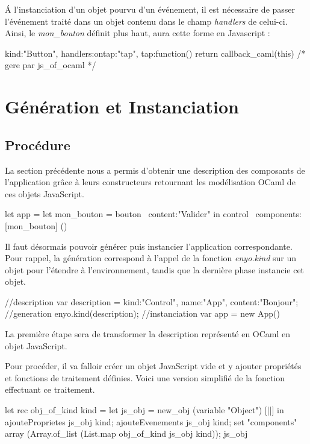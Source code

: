 \documentclass[11pt,a4paper]{report}
\begin{document}
\'A l'instanciation d'un objet pourvu d'un événement, il est nécessaire de passer l'événement traité
dans un objet contenu dans le champ \emph{handlers} de celui-ci. Ainsi, le \emph{mon\_bouton} définit plus haut,
aura cette forme en Javascript :

\begin{JavaScript}
  {kind:"Button", handlers:{ontap:"tap"}, 
    tap:function(){ return callback_caml(this) /* gere par js_of_ocaml */ }}
\end{JavaScript}

\section{Génération et Instanciation}
\subsection{Procédure}

La section précédente nous a permis d'obtenir une description des composants de l'application
grâce à leurs constructeurs retournant les modélisation OCaml de ces objets JavaScript.

\begin{OCaml}
let app = let mon_bouton = bouton ~content:"Valider" in
    control ~components:[mon_bouton] ()
\end{OCaml}

Il faut désormais pouvoir générer puis instancier l'application correspondante. Pour rappel, la génération
correspond à l'appel de la fonction \emph{enyo.kind} sur un objet pour l'étendre à l'environnement,
tandis que la dernière phase instancie cet objet.

\begin{JavaScript}
  //description
  var description = {kind:"Control", name:"App", content:"Bonjour"};
  //generation
  enyo.kind(description);
  //instanciation
  var app = new App()
\end{JavaScript}

La première étape sera de transformer la description représenté en OCaml en objet JavaScript.

Pour procéder, il va falloir créer un objet JavaScript vide et y ajouter propriétés et fonctions
de traitement définies. Voici une version simplifié de la fonction effectuant ce traitement.

\begin{OCaml}
  let rec obj_of_kind kind = 
      let js_obj = new_obj (variable "Object") [||] in
          ajouteProprietes js_obj kind;
          ajouteEvenements js_obj kind;
          set "components" array (Array.of_list (List.map obj_of_kind js_obj kind));
          js_obj
\end{OCaml}
\end{document}
